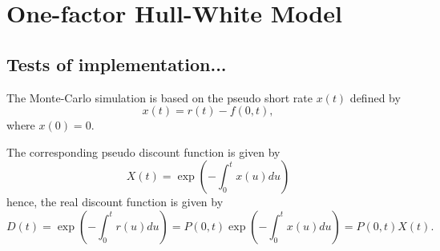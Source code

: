 \chapter{One-factor Hull-White Model}

\section{Tests of implementation...}

The Monte-Carlo simulation is based on the pseudo short rate $x(t)$ defined by
\begin{equation}
x(t) = r(t) - f(0,t),
\end{equation}
where $x(0) = 0$.

The corresponding pseudo discount function is given by
\begin{equation}
X(t) = \exp \left( - \int_0^t x(u) du \right)
\end{equation}
hence, the real discount function is given by
\begin{equation}
D(t) = \exp \left( - \int_0^t r(u) du \right) = P(0,t) \exp \left( - \int_0^t x(u) du \right) = P(0,t) X(t).
\end{equation}


